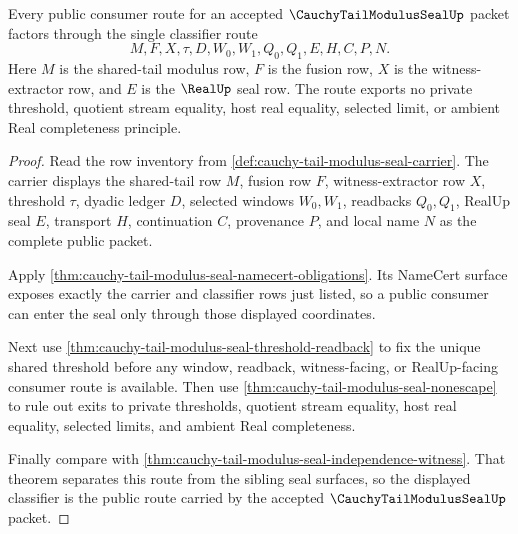 \begin{theorem}
\label{thm:cauchy-tail-modulus-seal-public-classifier-route}
Every public consumer route for an accepted $\CauchyTailModulusSealUp$ packet factors through the single classifier route
$$
M,F,X,\tau,D,W_0,W_1,Q_0,Q_1,E,H,C,P,N.
$$
Here $M$ is the shared-tail modulus row, $F$ is the fusion row, $X$ is the witness-extractor row, and $E$ is the $\RealUp$ seal row. The route exports no private threshold, quotient stream equality, host real equality, selected limit, or ambient Real completeness principle.
\end{theorem}
\begin{proof}
Read the row inventory from \autoref{def:cauchy-tail-modulus-seal-carrier}. The carrier displays the shared-tail row $M$, fusion row $F$, witness-extractor row $X$, threshold $\tau$, dyadic ledger $D$, selected windows $W_0,W_1$, readbacks $Q_0,Q_1$, RealUp seal $E$, transport $H$, continuation $C$, provenance $P$, and local name $N$ as the complete public packet.

Apply \autoref{thm:cauchy-tail-modulus-seal-namecert-obligations}. Its NameCert surface exposes exactly the carrier and classifier rows just listed, so a public consumer can enter the seal only through those displayed coordinates.

Next use \autoref{thm:cauchy-tail-modulus-seal-threshold-readback} to fix the unique shared threshold before any window, readback, witness-facing, or RealUp-facing consumer route is available. Then use \autoref{thm:cauchy-tail-modulus-seal-nonescape} to rule out exits to private thresholds, quotient stream equality, host real equality, selected limits, and ambient Real completeness.

Finally compare with \autoref{thm:cauchy-tail-modulus-seal-independence-witness}. That theorem separates this route from the sibling seal surfaces, so the displayed classifier is the public route carried by the accepted $\CauchyTailModulusSealUp$ packet.
\end{proof}

